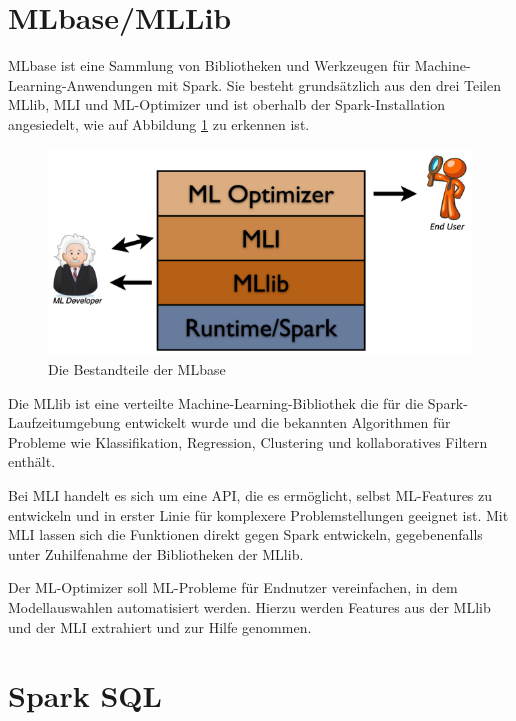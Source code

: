 \section{MLbase/MLLib}
\label{section:mLbase/MLLib}


MLbase ist eine Sammlung von Bibliotheken und Werkzeugen für Machine-Learning-Anwendungen mit Spark. Sie besteht grundsätzlich aus den drei Teilen MLlib, MLI und ML-Optimizer und ist oberhalb der Spark-Installation angesiedelt, wie auf Abbildung \ref{fig:mlbase} zu erkennen ist. 

\begin{figure}[htb!]
\centering
\includegraphics[width=1.0\textwidth]{bilder/2_4_3_mlbase.png}
\caption{Die Bestandteile der MLbase \protect{}}
\label{fig:mlbase}
\end{figure} 
 


Die MLlib ist eine verteilte Machine-Learning-Bibliothek die für die Spark-Laufzeitumgebung entwickelt wurde und die bekannten Algorithmen für Probleme wie Klassifikation, Regression, Clustering und kollaboratives Filtern enthält.

Bei MLI handelt es sich um eine API, die es ermöglicht, selbst ML-Features zu entwickeln und in erster Linie für komplexere Problemstellungen geeignet ist. Mit MLI lassen sich die Funktionen direkt gegen Spark entwickeln, gegebenenfalls unter Zuhilfenahme der Bibliotheken der MLlib.

Der ML-Optimizer soll ML-Probleme für Endnutzer vereinfachen, in dem Modellauswahlen automatisiert werden. Hierzu werden Features aus der MLlib und der MLI extrahiert und zur Hilfe genommen.



\section{Spark SQL}
\label{section:spark SQL}


